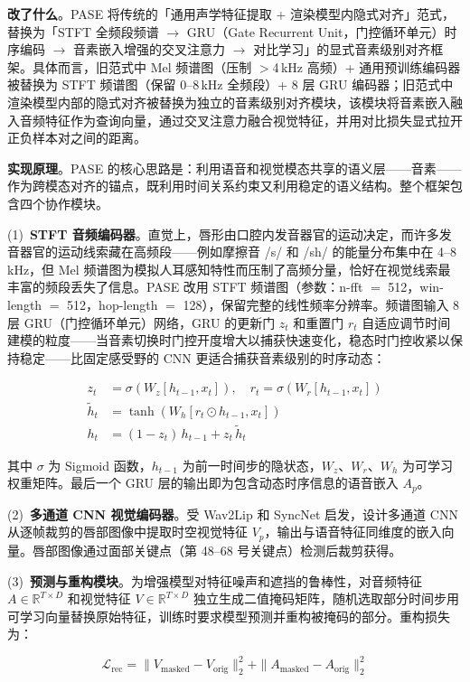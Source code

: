 \textbf{改了什么}。PASE 将传统的「通用声学特征提取 + 渲染模型内隐式对齐」范式，替换为「STFT 全频段频谱 $\to$ GRU（Gate Recurrent Unit，门控循环单元）时序编码 $\to$ 音素嵌入增强的交叉注意力 $\to$ 对比学习」的显式音素级别对齐框架。具体而言，旧范式中 Mel 频谱图（压制 $>$4\,kHz 高频）+ 通用预训练编码器被替换为 STFT 频谱图（保留 0--8\,kHz 全频段）+ 8 层 GRU 编码器；旧范式中渲染模型内部的隐式对齐被替换为独立的音素级别对齐模块，该模块将音素嵌入融入音频特征作为查询向量，通过交叉注意力融合视觉特征，并用对比损失显式拉开正负样本对之间的距离。

\textbf{实现原理}。PASE 的核心思路是：利用语音和视觉模态共享的语义层——音素——作为跨模态对齐的锚点，既利用时间关系约束又利用稳定的语义结构。整个框架包含四个协作模块。

(1)~\textbf{STFT 音频编码器}。直觉上，唇形由口腔内发音器官的运动决定，而许多发音器官的运动线索藏在高频段——例如摩擦音 /s/ 和 /sh/ 的能量分布集中在 4--8\,kHz，但 Mel 频谱图为模拟人耳感知特性而压制了高频分量，恰好在视觉线索最丰富的频段丢失了信息。PASE 改用 STFT 频谱图（参数：n-fft $=$ 512，win-length $=$ 512，hop-length $=$ 128），保留完整的线性频率分辨率。频谱图输入 8 层 GRU（门控循环单元）网络，GRU 的更新门 $z_t$ 和重置门 $r_t$ 自适应调节时间建模的粒度——当音素切换时门控开度增大以捕获快速变化，稳态时门控收紧以保持稳定——比固定感受野的 CNN 更适合捕获音素级别的时序动态：

\begin{align}
    z_t &= \sigma(W_z [h_{t-1}, x_t]), \quad r_t = \sigma(W_r [h_{t-1}, x_t]) \\
    \tilde{h}_t &= \tanh(W_h [r_t \odot h_{t-1}, x_t]) \\
    h_t &= (1 - z_t)\, h_{t-1} + z_t\, \tilde{h}_t
\end{align}

其中 $\sigma$ 为 Sigmoid 函数，$h_{t-1}$ 为前一时间步的隐状态，$W_z$、$W_r$、$W_h$ 为可学习权重矩阵。最后一个 GRU 层的输出即为包含动态时序信息的语音嵌入 $A_p$。

(2)~\textbf{多通道 CNN 视觉编码器}。受 Wav2Lip 和 SyncNet 启发，设计多通道 CNN 从逐帧裁剪的唇部图像中提取时空视觉特征 $V_p$，输出与语音特征同维度的嵌入向量。唇部图像通过面部关键点（第 48--68 号关键点）检测后裁剪获得。

(3)~\textbf{预测与重构模块}。为增强模型对特征噪声和遮挡的鲁棒性，对音频特征 $A \in \mathbb{R}^{T \times D}$ 和视觉特征 $V \in \mathbb{R}^{T \times D}$ 独立生成二值掩码矩阵，随机选取部分时间步用可学习向量替换原始特征，训练时要求模型预测并重构被掩码的部分。重构损失为：

\begin{equation}
    \mathcal{L}_\text{rec} = \|V_\text{masked} - V_\text{orig}\|_2^2 + \|A_\text{masked} - A_\text{orig}\|_2^2
\end{equation}

